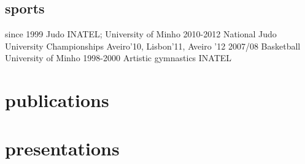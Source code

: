 \documentclass[a4paper]{friggeri-cv}
\begin{document}
\subsection{sports}{}
\begin{entrylist}
  \entry
    {{\footnotesize since} 1999}
    {Judo}
    {INATEL; University of Minho}
    {\vspace{-.8cm}}
  \entry
    {2010-2012}
    {National Judo University Championships}
    {Aveiro'10, Lisbon'11, Aveiro '12}
    {\vspace{-.8cm}}
  \entry
    {2007/08}
    {Basketball}
    {University of Minho}
    {\vspace{-.8cm}}
  \entry
    {1998-2000}
    {Artistic gymnastics}
    {INATEL}
    {}
\end{entrylist}

\newpage
\section{publications}

\begin{refsection}
  \nocite{*}
  \printbibliography[type=inproceedings, title={peer-reviewed conferences/proceedings}, heading=subbibliography]
\end{refsection}


\section{presentations}
\begin{refsection}
  \nocite{*}
  \printbibliography[type=misc, title={presentations}, heading=none]
\end{refsection}
\end{document}
